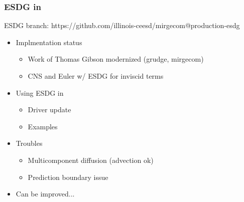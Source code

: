       
\begin{frame}\frametitle{ESDG in \mirgecom{}}
\vspace{15pt}
\begin{center}
\mirgecom{} ESDG branch: https://github.com/illinois-ceesd/mirgecom@production-esdg
\end{center}
\begin{itemize}
\item Implmentation status
\begin{itemize}
\item Work of Thomas Gibson modernized (grudge, mirgecom)
\item CNS and Euler w/ ESDG for inviscid terms
\end{itemize}
\item Using ESDG in \mirgecom{}
\begin{itemize}
\item Driver update
\item Examples
\end{itemize}
\item Troubles
\begin{itemize}
\item Multicomponent diffusion (advection ok)
\item Prediction boundary issue
\end{itemize}
\item Can be improved...
\end{itemize}
\end{frame}

